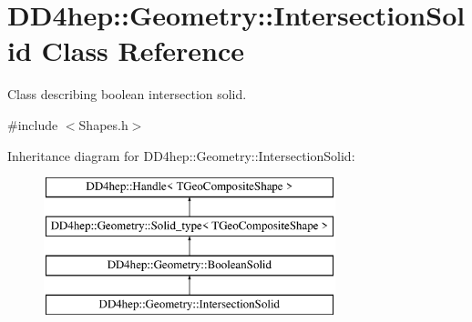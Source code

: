 \hypertarget{class_d_d4hep_1_1_geometry_1_1_intersection_solid}{}\section{D\+D4hep\+:\+:Geometry\+:\+:Intersection\+Solid Class Reference}
\label{class_d_d4hep_1_1_geometry_1_1_intersection_solid}


Class describing boolean intersection solid.  




{\ttfamily \#include $<$Shapes.\+h$>$}

Inheritance diagram for D\+D4hep\+:\+:Geometry\+:\+:Intersection\+Solid\+:\begin{figure}[H]
\begin{center}
\leavevmode
\includegraphics[height=4.000000cm]{class_d_d4hep_1_1_geometry_1_1_intersection_solid}
\end{center}
\end{figure}
